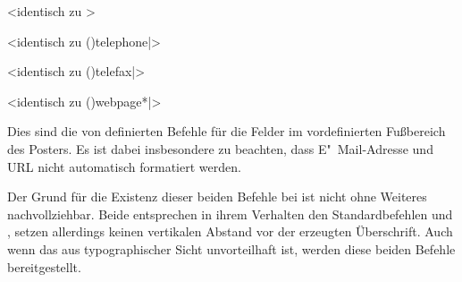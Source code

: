 \begin{DeclareEntity}{}
\begin{Declaration}
  {}
  <identisch zu >
\begin{Declaration}
  {}
<identisch zu \Macro*(){telephone|}>
\begin{Declaration}
  {}
  <identisch zu \Macro*(){telefax|}>
\begin{Declaration}
  {}
  <identisch zu \Macro*(){webpage*|}>
\printdeclarationlist

Dies sind die von  definierten Befehle für die Felder im 
vordefinierten Fußbereich des Posters. Es ist dabei insbesondere zu beachten, 
dass E"~Mail-Adresse und URL nicht automatisch formatiert werden.
\end{Declaration}
\end{Declaration}
\end{Declaration}
\end{Declaration}

\begin{Declaration}
  {}
\begin{Declaration}
  {}
\printdeclarationlist

Der Grund für die Existenz dieser beiden Befehle bei  ist 
nicht ohne Weiteres nachvollziehbar. Beide entsprechen in ihrem Verhalten den 
Standardbefehlen  und , setzen allerdings 
keinen vertikalen Abstand vor der erzeugten Überschrift. Auch wenn das aus 
typographischer Sicht unvorteilhaft ist, werden diese beiden Befehle 
bereitgestellt.
\end{Declaration}
\end{Declaration}

\begin{Declaration}
  {}
\begin{Declaration}
  {}
\begin{Declaration}
  {}
\begin{Declaration}
  {}
\printdeclarationlist


\end{Declaration}
\end{Declaration}
\end{Declaration}
\end{Declaration}
\end{DeclareEntity}
